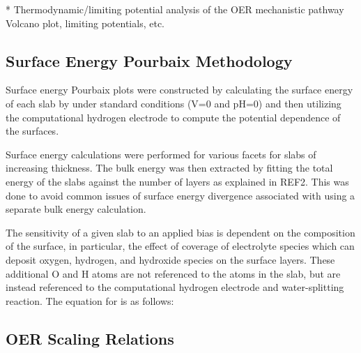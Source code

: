 * Thermodynamic/limiting potential analysis of the OER mechanistic pathway Volcano plot, limiting potentials, etc.



\subsection{Surface Energy Pourbaix Methodology}  %
%
Surface energy Pourbaix plots were constructed by calculating the surface energy of each slab by under standard conditions (V=0 and pH=0) and then utilizing the computational hydrogen electrode to compute the potential dependence of the surfaces.

Surface energy calculations were performed for various facets for slabs of increasing thickness.
The bulk energy was then extracted by fitting the total energy of the slabs against the number of layers as explained in REF2.
This was  done to avoid common issues of surface energy divergence associated with using a separate bulk energy calculation.

The sensitivity of a given slab to an applied bias is dependent on the composition of the surface,
in particular, the effect of coverage of electrolyte species which can deposit oxygen, hydrogen, and hydroxide species on the surface layers.
These additional O and H atoms are not referenced to the atoms in the slab, but are instead referenced to the computational hydrogen electrode and water-splitting reaction.
The equation for is as follows:



\subsection{OER Scaling Relations}  %
%

